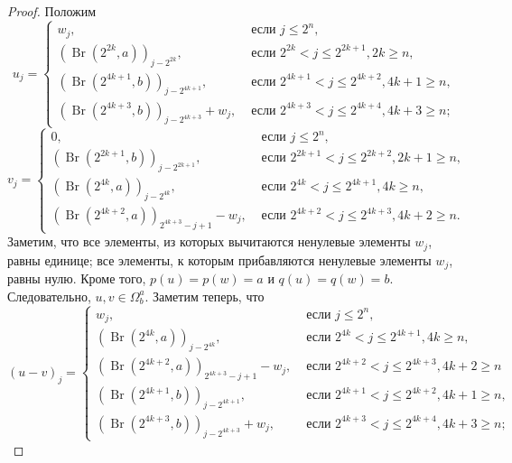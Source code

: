 \begin{proof}
	Положим
	\begin{equation}
		u_j = \begin{cases}
			w_j,  & \mbox{~если~} j \leq 2^n,
			\\
			(\operatorname{Br}(2^{2k  },a))_{j-2^{2k}},  & \mbox{~если~} 2^{2k} < j \leq 2^{2k+1}, 2k \geq n,
			\\
			(\operatorname{Br}(2^{4k+1},b))_{j-2^{4k+1}},  & \mbox{~если~} 2^{4k+1} < j \leq 2^{4k+2}, 4k + 1 \geq n,
			\\
			(\operatorname{Br}(2^{4k+3},b))_{j-2^{4k+3}} + w_j,  & \mbox{~если~} 2^{4k+3} < j \leq 2^{4k+4}, 4k + 3 \geq n
			;
		\end{cases}
	\end{equation}
	\begin{equation}
		v_j = \begin{cases}
			0,  & \mbox{~если~} j \leq 2^n,
			\\
			(\operatorname{Br}(2^{2k+1},b))_{j-2^{2k+1}},  & \mbox{~если~} 2^{2k+1} < j \leq 2^{2k+2}, 2k+1 \geq n,
			\\
			(\operatorname{Br}(2^{4k  },a))_{j-2^{4k  }},  & \mbox{~если~} 2^{4k  } < j \leq 2^{4k+1}, 4k    \geq n,
			\\
			(\operatorname{Br}(2^{4k+2},a))_{2^{4k+3}-j+1} - w_j,  & \mbox{~если~} 2^{4k+2} < j \leq 2^{4k+3}, 4k + 2 \geq n
			.
		\end{cases}
	\end{equation}
	Заметим, что все элементы, из которых вычитаются ненулевые элементы $w_j$, равны единице;
	все элементы, к которым прибавляются ненулевые элементы $w_j$, равны нулю.
	Кроме того, $p(u)=p(w)=a$ и $q(u)=q(w)=b$.
	Следовательно, $u,v\in\Omega^a_b$.
	Заметим теперь, что
	\begin{equation}
		(u-v)_j = \begin{cases}
			w_j,  & \mbox{~если~} j \leq 2^n,
			\\
			(\operatorname{Br}(2^{4k  },a))_{j-2^{4k  }},  & \mbox{~если~} 2^{4k  } < j \leq 2^{4k+1}, 4k    \geq n,
			\\
			(\operatorname{Br}(2^{4k+2},a))_{2^{4k+3}-j+1} - w_j,  & \mbox{~если~} 2^{4k+2} < j \leq 2^{4k+3}, 4k + 2 \geq n

			\\
			(\operatorname{Br}(2^{4k+1},b))_{j-2^{4k+1}},  & \mbox{~если~} 2^{4k+1} < j \leq 2^{4k+2}, 4k + 1 \geq n,
			\\
			(\operatorname{Br}(2^{4k+3},b))_{j-2^{4k+3}} + w_j,  & \mbox{~если~} 2^{4k+3} < j \leq 2^{4k+4}, 4k + 3 \geq n
			;
		\end{cases}
	\end{equation}



\end{proof}

